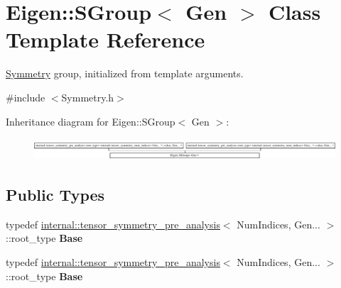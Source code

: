 \hypertarget{class_eigen_1_1_s_group}{}\section{Eigen\+:\+:S\+Group$<$ Gen $>$ Class Template Reference}
\label{class_eigen_1_1_s_group}


\hyperlink{struct_eigen_1_1_symmetry}{Symmetry} group, initialized from template arguments.  




{\ttfamily \#include $<$Symmetry.\+h$>$}

Inheritance diagram for Eigen\+:\+:S\+Group$<$ Gen $>$\+:\begin{figure}[H]
\begin{center}
\leavevmode
\includegraphics[height=0.817518cm]{class_eigen_1_1_s_group}
\end{center}
\end{figure}
\subsection*{Public Types}
\begin{DoxyCompactItemize}
\item 
\mbox{\label{class_eigen_1_1_s_group_a7457e4f2ce0e62e54e84130a655e211a}} 
typedef \hyperlink{struct_eigen_1_1internal_1_1tensor__symmetry__pre__analysis}{internal\+::tensor\+\_\+symmetry\+\_\+pre\+\_\+analysis}$<$ Num\+Indices, Gen... $>$\+::root\+\_\+type {\bfseries Base}
\item 
\mbox{\label{class_eigen_1_1_s_group_a7457e4f2ce0e62e54e84130a655e211a}} 
typedef \hyperlink{struct_eigen_1_1internal_1_1tensor__symmetry__pre__analysis}{internal\+::tensor\+\_\+symmetry\+\_\+pre\+\_\+analysis}$<$ Num\+Indices, Gen... $>$\+::root\+\_\+type {\bfseries Base}
\end{DoxyCompactItemize}

